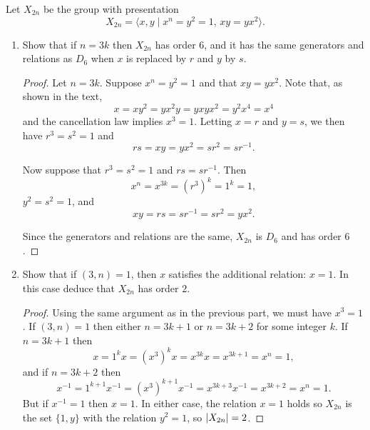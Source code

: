  Let $X_{2n}$ be the group with presentation
\begin{equation*}
  X_{2n} = \langle x, y \mid x^n = y^2 = 1,\,xy = yx^2\rangle.
\end{equation*}
\begin{enumerate}
\item Show that if $n = 3k$ then $X_{2n}$ has order $6$, and it has
  the same generators and relations as $D_6$ when $x$ is replaced by
  $r$ and $y$ by $s$.
  \begin{proof}
    Let $n = 3k$. Suppose $x^n = y^2 = 1$ and that $xy =
    yx^2$. Note that, as shown in the text,
    \begin{equation*}
      x = xy^2 = yx^2y = yxyx^2 = y^2x^4 = x^4
    \end{equation*}
    and the cancellation law implies $x^3 = 1$. Letting $x = r$ and
    $y = s$, we then have $r^3 = s^2 = 1$ and
    \begin{equation*}
      rs = xy = yx^2 = sr^2 = sr^{-1}.
    \end{equation*}

    Now suppose that $r^3 = s^2 = 1$ and $rs = sr^{-1}$. Then
    \begin{equation*}
      x^n = x^{3k} = (r^3)^k = 1^k = 1,
    \end{equation*}
    $y^2 = s^2 = 1$, and
    \begin{equation*}
      xy = rs = sr^{-1} = sr^2 = yx^2.
    \end{equation*}

    Since the generators and relations are the same, $X_{2n}$ is $D_6$
    and has order $6$.
  \end{proof}
\item Show that if $(3,n) = 1$, then $x$ satisfies the additional
  relation: $x = 1$. In this case deduce that $X_{2n}$ has order $2$.
  \begin{proof}
    Using the same argument as in the previous part, we must have
    $x^3 = 1$. If $(3,n) = 1$ then either $n = 3k + 1$ or $n = 3k + 2$
    for some integer $k$. If $n = 3k + 1$ then
    \begin{equation*}
      x = 1^kx = (x^3)^kx = x^{3k}x = x^{3k+1} = x^n = 1,
    \end{equation*}
    and if $n = 3k + 2$ then
    \begin{equation*}
      x^{-1} = 1^{k+1}x^{-1} = (x^3)^{k+1}x^{-1} = x^{3k+3}x^{-1}
      = x^{3k+2} = x^n = 1.
    \end{equation*}
    But if $x^{-1} = 1$ then $x = 1$. In either case, the relation
    $x = 1$ holds so $X_{2n}$ is the set $\{1, y\}$ with the relation
    $y^2 = 1$, so $\lvert{X_{2n}}\rvert = 2$.
  \end{proof}
\end{enumerate}
